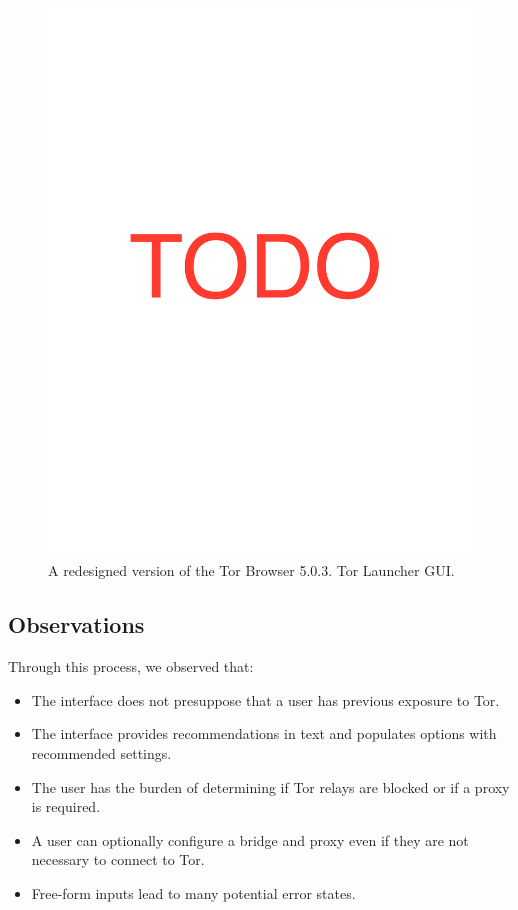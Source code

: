 \documentclass[USenglish,oneside,twocolumn]{article}
\begin{document}
\begin{figure}
\centering
\includegraphics[width=\textwidth]{placeholder-fullpage.pdf}
\caption{
A redesigned version of the Tor Browser 5.0.3. Tor Launcher GUI. 
}
\label{fig:old-interface}
\end{figure} 

\subsection{Observations}
Through this process, we observed that:  \\
\begin{itemize} 
\item The interface does not presuppose that a user has previous exposure to Tor. 
\item The interface provides recommendations in text and populates options with recommended settings. 
\item The user has the burden of determining if Tor relays are blocked or if a proxy is required. 
\item A user can optionally configure a bridge and proxy even if they are not necessary to connect to Tor. 
\item Free-form inputs lead to many potential error states. 
\end{itemize} 
\end{document}
